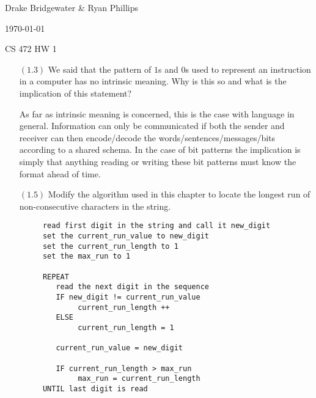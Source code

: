 \documentclass[letterpaper,12pt,titlepage]{article}
\def\name{Drake Bridgewater \& Ryan Phillips}
\begin{document}
\hfill \name

\hfill \today

\hfill CS 472 HW 1

\begin{enumerate}
\item[$(1.3)$] We said that the pattern of $1$s and $0$s used to represent an instruction
  in a computer has no intrinsic meaning. Why is this so and what is the implication of
  this statement?
  
As far as intrinsic meaning is concerned, this is the case with language in general. Information can only be communicated if both the sender and receiver can then encode/decode the words/sentences/messages/bits according to a shared schema. In the case of bit patterns the implication is simply that anything reading or writing these bit patterns must know the format ahead of time.

  
  \begin{enumerate}
  \item[] 
  \end{enumerate}

\item[$(1.5)$] Modify the algorithm used in this chapter to locate the longest run of
  non-consecutive characters in the string.
  
  \begin{enumerate}
  \item[] \begin{verbatim}
  read first digit in the string and call it new_digit
  set the current_run_value to new_digit
  set the current_run_length to 1
  set the max_run to 1
  
  REPEAT
     read the next digit in the sequence
     IF new_digit != current_run_value
          current_run_length ++
     ELSE 
          current_run_length = 1

     current_run_value = new_digit     
         
     IF current_run_length > max_run 
          max_run = current_run_length
  UNTIL last digit is read   
  
  \end{verbatim}
  \end{enumerate}
  

\end{enumerate}
\end{document}
